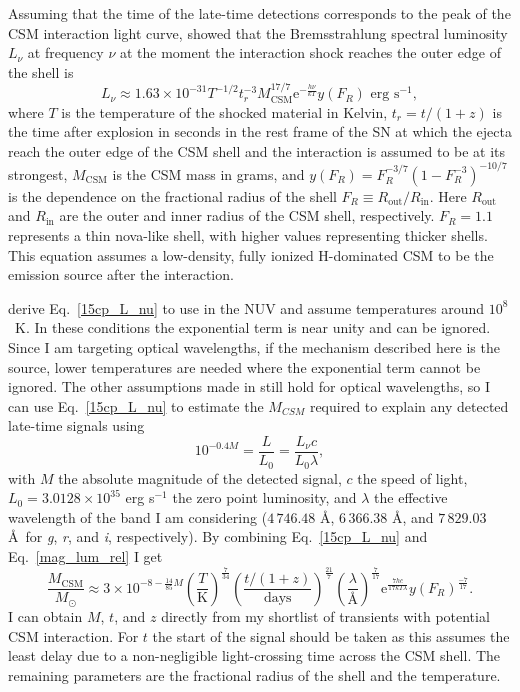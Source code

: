\documentclass[a4paper,oneside,12pt, class=Latex/Classes/PhDthesisPSnPDF, crop=false]{standalone}
\begin{document}
Assuming that the time of the late-time detections corresponds to the peak of the CSM interaction light curve, \citet{2015cp} showed that the Bremsstrahlung spectral luminosity $L_\nu$ at frequency $\nu$ at the moment the interaction shock reaches the outer edge of the shell is
\begin{equation}
    \label{15cp_L_nu}
    L_\nu \approx 1.63 \times 10^{-31} T^{-1/2} t_r^{-3} M_\text{CSM}^{17/7} \text{e}^{-\frac{h\nu}{kT}} y(F_R) \text{ erg s}^{-1},
\end{equation}
where $T$ is the temperature of the shocked material in Kelvin, $t_r = t/(1+z)$ is the time after explosion in seconds in the rest frame of the SN at which the ejecta reach the outer edge of the CSM shell and the interaction is assumed to be at its strongest, $M_\text{CSM}$ is the CSM mass in grams, and $y(F_R) = F_R^{-3/7}(1-F_R^{-3})^{-10/7}$ is the dependence on the fractional radius of the shell $F_R \equiv R_\text{out} / R_\text{in}$. Here $R_\text{out}$ and $R_\text{in}$ are the outer and inner radius of the CSM shell, respectively. $F_R = 1.1$ represents a thin nova-like shell, with higher values representing thicker shells. This equation assumes a low-density, fully ionized H-dominated CSM to be the emission source after the interaction.

\citet{2015cp} derive Eq.~\ref{15cp_L_nu} to use in the NUV and assume temperatures around $10^8$~K. In these conditions the exponential term is near unity and can be ignored. Since I am targeting optical wavelengths, if the mechanism described here is the source, lower temperatures are needed where the exponential term cannot be ignored. The other assumptions made in \citet{2015cp} still hold for optical wavelengths, so I can use Eq.~\ref{15cp_L_nu} to estimate the $M_{CSM}$ required to explain any detected late-time signals using
\begin{equation}
    \label{mag_lum_rel}
    10^{-0.4M} = \frac{L}{L_0} = \frac{L_\nu c}{L_0 \lambda},
\end{equation}
with $M$ the absolute magnitude of the detected signal, $c$ the speed of light, $L_0 = 3.0128 \times 10^{35}$ erg s$^{-1}$ the zero point luminosity, and $\lambda$ the effective wavelength of the band I am considering ($4\,746.48$ \AA, $6\,366.38$ \AA, and $7\,829.03$ \AA~for \textit{g}, \textit{r}, and \textit{i}, respectively). By combining Eq.~\ref{15cp_L_nu} and Eq.~\ref{mag_lum_rel} I get
\begin{equation}
    \frac{M_\text{CSM}}{M_\odot} \approx 3 \times 10^{-8-\frac{14}{85}M} \left(\frac{T}{\text{K}}\right)^{\frac{7}{34}} \left(\frac{t/(1+z)}{\text{days}}\right)^{\frac{21}{7}} \left(\frac{\lambda}{\text{\AA}}\right)^{\frac{7}{17}} \text{e}^{\frac{7hc}{17kT\lambda}} y(F_R)^{\frac{-7}{17}}.
    \label{M_CSM_eq}
\end{equation}
I can obtain $M$, $t$, and $z$ directly from my shortlist of transients with potential CSM interaction. For $t$ the start of the signal should be taken as this assumes the least delay due to a non-negligible light-crossing time across the CSM shell. The remaining parameters are the fractional radius of the shell and the temperature.
\end{document}
